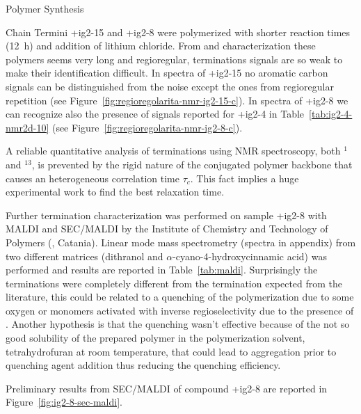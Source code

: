 \begin{section}{Polymer Synthesis}
\begin{subsection}{Chain Termini}
\cmpd+{ig2-15} and \cmpd+{ig2-8} were polymerized with shorter reaction times (\SI{12}{\hour}) and addition of lithium chloride. From {\HNMR} and {\CNMR} characterization these polymers seems very long and regioregular, terminations signals are so weak to make their identification difficult.
In {\CNMR} spectra of \cmpd+{ig2-15} no aromatic carbon signals can be distinguished from the noise except the ones from regioregular repetition (see Figure~\ref{fig:regioregolarita-nmr-ig2-15-c}). In {\CNMR} spectra of \cmpd+{ig2-8} we can recognize also the presence of signals reported for \cmpd+{ig2-4} in Table~\ref{tab:ig2-4-nmr2d-10} (see Figure~\ref{fig:regioregolarita-nmr-ig2-8-c}). 

A reliable quantitative analysis of terminations using \gls{NMR} spectroscopy, both $^1$ and $^{13}$, is prevented by the rigid nature of the conjugated polymer backbone that causes an heterogeneous correlation time $\tau_c$. This fact implies a huge experimental work to find the best relaxation time.

Further termination characterization was performed on sample \cmpd+{ig2-8} with \acrfull{MALDI} and \gls{SEC}\-/\gls{MALDI} by the Institute of Chemistry and Technology of Polymers (, Catania). 
Linear mode mass spectrometry (spectra in appendix) from two different matrices (di\-thranol and $\alpha$-cyano-4-hydr\-oxy\-cinnamic acid) was performed and results are reported in Table~\ref{tab:maldi}. Surprisingly the terminations were completely different from the  termination expected from the literature, this could be related to a quenching of the polymerization 
due to some oxy\-gen or monomers activated with inverse regioselectivity due to the presence of . 
Another hypothesis is that the quenching wasn't effective because of the not so good solubility of the prepared polymer in the polymerization solvent, tetrahydrofuran at room temperature, that could lead to aggregation prior to quenching agent addition thus reducing the quenching efficiency. 

Preliminary results from \gls{SEC}\-/\gls{MALDI} of compound \cmpd+{ig2-8} are reported in Figure~\ref{fig:ig2-8-sec-maldi}.


\end{subsection}
\end{section}
